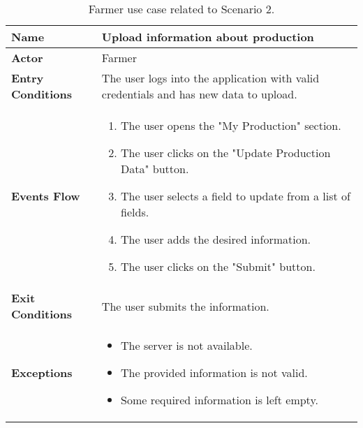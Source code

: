 \begin{table}[hbt!]
\centering
\caption{\label{tab:addOne{table_counter}}Farmer use case related to Scenario 2.}
\renewcommand{\arraystretch}{1.25}
\begin{tabular}{|l|>{\raggedright\arraybackslash}m{12cm}|}

    \hline
    \textbf{Name} & Upload information about production\\
    \hline
   	\textbf{Actor} & Farmer\\
    \hline
    \textbf{Entry Conditions} & The user logs into the application with valid credentials and has new data to upload.\\
    \hline
    
    \textbf{Events Flow} & 
    		\begin{enumerate}
    			\item The user opens the "My Production" section.
    			\item The user clicks on the "Update Production Data" button.
    			\item The user selects a field to update from a list of fields.
    			\item The user adds the desired information.
    			\item The user clicks on the "Submit" button.
    		\end{enumerate}
    	\\
    \hline
    \textbf{Exit Conditions} & The user submits the information.\\
    \hline
    \textbf{Exceptions} & 
    		\begin{itemize}
    			\item The server is not available.
    			\item The provided information is not valid.
    			\item Some required information is left empty.
    		\end{itemize}
    \\
    \hline
\end{tabular}
\end{table}